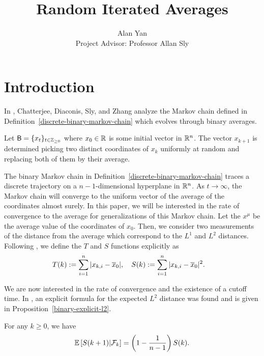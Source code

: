 \documentclass[12pt]{article}
\title{Random Iterated Averages}
\author{Alan Yan \\ Project Advisor: Professor Allan Sly}
\begin{document}
\maketitle
\tableofcontents

\newpage 

\section{Introduction}

In \cite{chatterjee2021phase}, Chatterjee, Diaconis, Sly, and Zhang analyze the Markov chain defined in Definition~\ref{discrete-binary-markov-chain} which evolves through binary averages.  
\begin{defn} \label{discrete-binary-markov-chain}
	Let $\mathsf{B} = \{x_t\}_{t \in \mathbb{Z}_{\geq 0}}$ where $x_0 \in \mathbb{R}$ is some initial vector in $\mathbb{R}^n$. The vector $x_{k+1}$ is determined picking two distinct coordinates of $x_k$ uniformly at random and replacing both of them by their average. 
\end{defn}

The binary Markov chain in Definition~\ref{discrete-binary-markov-chain} traces a discrete trajectory on a $n-1$-dimensional hyperplane in $\mathbb{R}^n$. As $t \to \infty$, the Markov chain will converge to the uniform vector of the average of the coordinates almost surely. In this paper, we will be interested in the rate of convergence to the average for generalizations of this Markov chain. Let the $x^\mu$ be the average value of the coordinates of $x_0$. Then, we consider two measurements of the distance from the average which correspond to the $L^1$ and $L^2$ distances. Following \cite{chatterjee2021phase}, we define the $T$ and $S$ functions explicitly as 
\begin{align*}
	T(k) & := \sum_{i = 1}^n |x_{k, i} - \overline{x}_0|, \quad S(k) := \sum_{i = 1}^n |x_{k, i} - \overline{x}_0|^2.
\end{align*}

We are now interested in the rate of convergence and the existence of a cutoff time. In \cite{chatterjee2021phase}, an explicit formula for the expected $L^2$ distance was found and is given in Proposition~\ref{binary-explicit-l2}.

\begin{prop} \label{binary-explicit-l2}
	For any $k \geq 0$, we have 
	\[
		\mathbb{E} \left [ S(k+1) | \mathcal{F}_k \right ] = \left ( 1 - \frac{1}{n-1} \right ) S(k).
	\]	
\end{prop}
\end{document}
